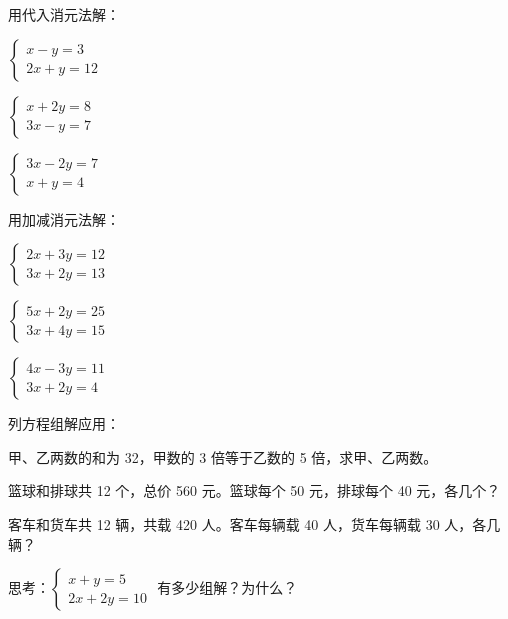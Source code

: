 \begin{exercise}
\item 用代入消元法解：
  \begin{subexercise}
    \item $\begin{cases}x-y=3\\2x+y=12\end{cases}$
    \item $\begin{cases}x+2y=8\\3x-y=7\end{cases}$
    \item $\begin{cases}3x-2y=7\\x+y=4\end{cases}$
  \end{subexercise}

\item 用加减消元法解：
  \begin{subexercise}
    \item $\begin{cases}2x+3y=12\\3x+2y=13\end{cases}$
    \item $\begin{cases}5x+2y=25\\3x+4y=15\end{cases}$
    \item $\begin{cases}4x-3y=11\\3x+2y=4\end{cases}$
  \end{subexercise}

\item 列方程组解应用：
  \begin{subexercise}
    \item 甲、乙两数的和为 32，甲数的 3 倍等于乙数的 5 倍，求甲、乙两数。
    \item 篮球和排球共 12 个，总价 560 元。篮球每个 50 元，排球每个 40 元，各几个？
    \item 客车和货车共 12 辆，共载 420 人。客车每辆载 40 人，货车每辆载 30 人，各几辆？
  \end{subexercise}

\item 思考：$\begin{cases}x+y=5\\2x+2y=10\end{cases}$ 有多少组解？为什么？
\end{exercise}

